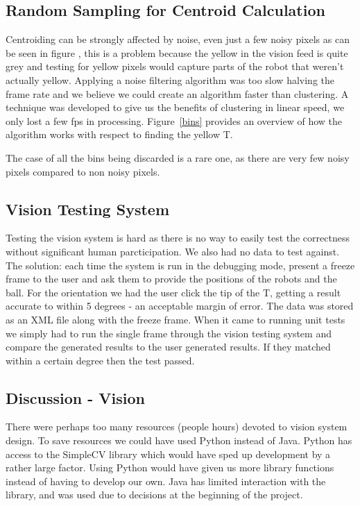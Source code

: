 \subsection{Random Sampling for Centroid Calculation}

Centroiding can be strongly affected by noise, even just a few noisy pixels as
can be seen in figure \cite{vis1}, this is a problem  because the yellow in the
vision feed is quite grey and testing for yellow pixels would capture parts of
the robot that weren't actually yellow.  Applying a noise filtering algorithm
was too slow halving the frame rate and we believe we could create an algorithm
faster than clustering.  A technique was developed to give us the benefits of
clustering in linear speed, we only lost a few fps in processing.
Figure~\ref{bins} provides an overview of how the algorithm works with respect
to finding the yellow T.

The case of all the bins being discarded is a rare one, as there are very few
noisy pixels compared to non noisy pixels.  

\subsection{Vision Testing System}

Testing the vision system is hard as there is no way to easily test the
correctness without significant human parcticipation. We also had no data to test 
against. The solution: each time the
system is run in the debugging mode, present a freeze frame to the user and ask
them to provide the positions of the robots and the ball. For the orientation
we had the user click the tip of the T, getting a result accurate to within 5
degrees - an acceptable margin of error. The data was stored as an XML file
along with the freeze frame. When it came to running unit tests we simply had
to run the single frame through the vision testing system and compare the
generated results to the user generated results. If they matched within a
certain degree then the test passed. 

\subsection{Discussion - Vision}

There were perhaps too many resources (people hours) devoted to vision system
design.  To save resources we could have used Python instead of Java. Python
has access to the SimpleCV library which would have sped up development by a
rather large factor.  Using Python would have given us more library functions
instead of having to develop our own. Java has limited interaction with the
library, and was used due to decisions at the beginning of the project.
